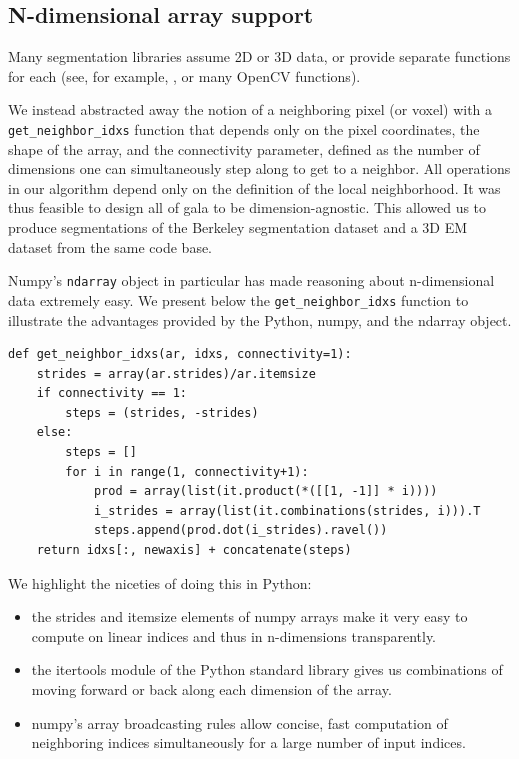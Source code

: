 \documentclass{frontiersSCNS} %
\begin{document}
\subsection{N-dimensional array support}

Many segmentation libraries assume 2D or 3D data, or provide separate functions for each (see, for example, \cite{slic-website}, or many OpenCV functions).

We instead abstracted away the notion of a neighboring pixel (or voxel) with a \texttt{\small get\_neighbor\_idxs} function that depends only on the pixel coordinates, the shape of the array, and the connectivity parameter, defined as the number of dimensions one can simultaneously step along to get to a neighbor.
All operations in our algorithm depend only on the definition of the local neighborhood. 
It was thus feasible to design all of gala to be dimension-agnostic.
This allowed us to produce segmentations of the Berkeley segmentation dataset \citep{MartinFTM01} and a 3D EM dataset from the same code base.

Numpy's \texttt{\small ndarray} object in particular has made reasoning about n-dimensional data extremely easy.
We present below the \texttt{\small get\_neighbor\_idxs} function to illustrate the advantages provided by the Python, numpy, and the ndarray object.

{\small
\begin{verbatim}
def get_neighbor_idxs(ar, idxs, connectivity=1):
    strides = array(ar.strides)/ar.itemsize
    if connectivity == 1: 
        steps = (strides, -strides)
    else:
        steps = []
        for i in range(1, connectivity+1):
            prod = array(list(it.product(*([[1, -1]] * i))))
            i_strides = array(list(it.combinations(strides, i))).T
            steps.append(prod.dot(i_strides).ravel())
    return idxs[:, newaxis] + concatenate(steps)
\end{verbatim}
}

We highlight the niceties of doing this in Python:
\begin{itemize}
\item the strides and itemsize elements of numpy arrays make it very easy to compute on linear indices and thus in n-dimensions transparently.
\item the itertools module of the Python standard library gives us combinations of moving forward or back along each dimension of the array.
\item numpy's array broadcasting rules allow concise, fast computation of neighboring indices simultaneously for a large number of input indices.
\end{itemize}
\end{document}
